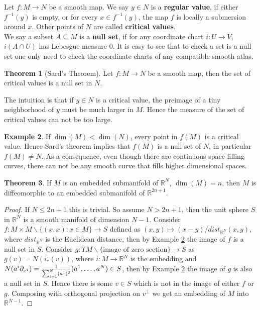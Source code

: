 \documentclass{article}
\theoremstyle{definition}
\newtheorem{thm}{Theorem}[section]
\newtheorem{exm}[thm]{Example}
\begin{document}
Let $f: M\rightarrow N$ be a smooth map. We say $y\in N$ is a {\bf regular value}, if either $f^{-1}(y)$ is empty, or for every $x\in f^{-1}(y)$, the map $f$ is locally a submersion around $x$. Other points of $N$ are called {\bf critical values}.\\

We say a subset $A\subseteq M$ is a {\bf null set}, if for any coordinate chart $i: U\rightarrow V$, $i(A\cap U)$ has Lebesgue measure $0$. It is easy to see that to check a set is a null set one only need to check the coordinate charts of any compatible smooth atlas.

\begin{thm}[Sard's Theorem]\label{sard}
    Let $f: M\rightarrow N$ be a smooth map, then the set of critical values is a null set in $N$.
\end{thm}

The intuition is that if $y\in N$ is a critical value, the preimage of a tiny neighborhood of $y$ must be much larger in $M$. Hence the measure of the set of critical values can not be too large.\\

\begin{exm}\label{imgnull}
    If $\dim(M)<\dim(N)$, every point in $f(M)$ is a critical value. Hence Sard's theorem implies that $f(M)$ is a null set of $N$, in particular $f(M)\not=N$. As a consequence, even though there are continuous space filling curves, there can not be any smooth curve that fills higher dimensional spaces.
\end{exm}

\begin{thm}\label{emb0}
    If $M$ is an embedded submanifold of $\mathbb{R}^N$, $\dim(M)=n$, then $M$ is diffeomorphic to an embedded submanifold of $\mathbb{R}^{2n+1}$.
\end{thm}

\begin{proof}
    If $N\leq 2n+1$ this is trivial. So assume $N>2n+1$, then the unit sphere $S$ in $\mathbb{R}^N$ is a smooth manifold of dimension $N-1$. Consider $f: M\times M\backslash \{(x, x): x\in M\}\rightarrow S$ defined as $(x, y)\mapsto (x-y)/dist_{\mathbb{R}^N}(x, y)$, where $dist_{\mathbb{R}^N}$ is the Euclidean distance, then by Example \ref{imgnull} the image of $f$ is a null set in $S$. Consider $g: TM\backslash \{\text{image of zero section}\}\rightarrow S$ as $g(v)=N(i_*(v))$, where $i: M\rightarrow\mathbb{R}^N$ is the embedding and $N(a^i\partial_{x^i})={1\over \sum_{i=1}^N(a^1)^2}(a^1, \dots, a^N)\in S$, then by Example \ref{imgnull} the image of $g$ is also a null set in $S$. Hence there is some $v\in S$ which is not in the image of either $f$ or $g$. Composing with orthogonal projection on $v^\perp$ we get an embedding of $M$ into $\mathbb{R}^{N-1}$. 
\end{proof}
\end{document}
